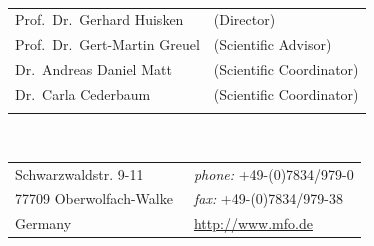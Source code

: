 \documentclass[a4paper,12pt]{article}
\begin{document}
\\[1ex]
\begin{tabular}{ll}
Prof.~Dr.~Gerhard Huisken & (Director)\\
Prof.~Dr.~Gert-Martin Greuel\quad\quad\quad\quad & (Scientific Advisor)\\
Dr.~Andreas Daniel Matt & (Scientific Coordinator)\\
Dr.~Carla Cederbaum & (Scientific Coordinator)\\
\quad&\\[-1ex]
\end{tabular}

\\[1ex]
\begin{tabular}{ll}
Schwarzwaldstr. 9-11&\,\,\,{\it phone:} +49-(0)7834/979-0\\
77709 Oberwolfach-Walke\quad\quad\quad\quad&\,\,\,{\it fax:} +49-(0)7834/979-38\\
Germany&\,\,\,\url{http://www.mfo.de}
\end{tabular}
\end{document}
